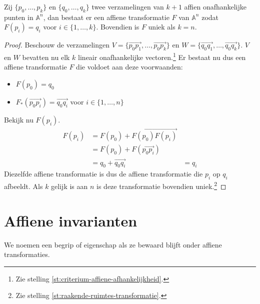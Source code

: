 \documentclass[main.tex]{subfiles}
\begin{document}
\begin{gev}
  Zij $\{p_{0},\dotsc,p_{k}\}$ en $\{q_{0},\dotsc,q_{k}\}$ twee verzamelingen van $k+1$ affien onafhankelijke punten in $\mathbb{A}^{n}$, dan bestaat er een affiene transformatie $F$ van $\mathbb{A}^{n}$ zodat $F(p_{i}) = q_{i}$ voor $i \in \{ 1,\dotsc,k \}$. Bovendien is $F$ uniek als $k=n$.

  \begin{proof}
    Beschouw de verzamelingen $V = \{\overrightarrow{p_{0}p_{1}},\dotsc,\overrightarrow{p_{0}p_{k}}\}$ en $W = \{\overrightarrow{q_{0}q_{1}},\dotsc,\overrightarrow{q_{0}q_{k}}\}$.
    $V$ en $W$ bevatten nu elk $k$ lineair onafhankelijke vectoren.\footnote{Zie stelling \ref{st:criterium-affiene-afhankelijkheid}.}
    Er bestaat nu dus een affiene transformatie $F$ die voldoet aan deze voorwaanden:
    \begin{itemize}
    \item $F(p_{0}) = q_{0}$
    \item $F_{*}(\overrightarrow{p_{0}p_{i}}) = \overrightarrow{q_{0}q_{i}}$ voor $i \in \{ 1,\dotsc,n \}$
    \end{itemize}
    Bekijk nu $F(p_{i})$.
    \[
    \begin{array}{rll}
      F(p_{i}) &= F(p_{0}) + \overrightarrow{F(p_{0})F(p_{i})} &\\
               &= F(p_{0}) + F(\overrightarrow{p_{0}p_{i}}) &\\
               &= q_{0} + \overrightarrow{q_{0}q_{i}} &= q_{i}
    \end{array} 
    \]
    Diezelfde affiene transformatie is dus de affiene transformatie die $p_{i}$ op $q_{i}$ afbeeldt.
    Als $k$ gelijk is aan $n$ is deze transformatie bovendien uniek.\footnote{Zie stelling \ref{st:raakende-ruimtes-transformatie}.}
   \end{proof}
\end{gev}


\section{Affiene invarianten}
\label{sec:affiene-invarianten}

\begin{de}
  We noemen een begrip of eigenschap  als ze bewaard blijft onder affiene transformaties.
\end{de}
\end{document}
